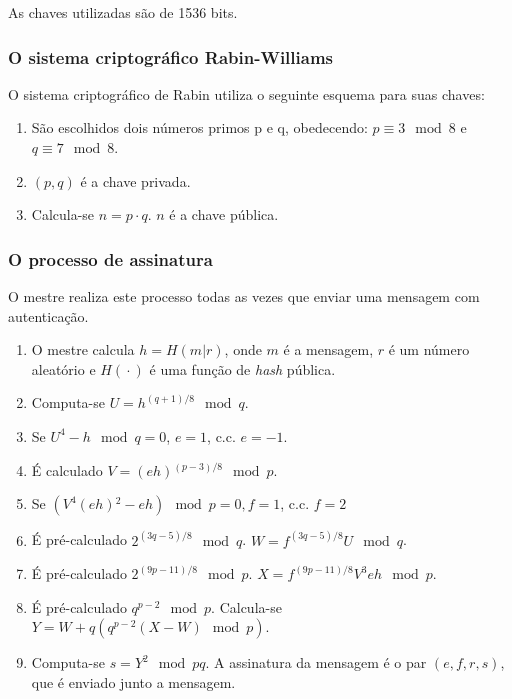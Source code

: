 As chaves utilizadas são de 1536 bits.

\subsubsection{O sistema criptográfico Rabin-Williams}

O sistema criptográfico de Rabin utiliza o seguinte esquema para suas chaves:

\begin{enumerate}

\item São escolhidos dois números primos p e q, obedecendo: $p \equiv 3 \mod{8}$ e $q \equiv 7 \mod{8}$.

\item $\left({}p,q\right)$ é a chave privada.

\item Calcula-se $n=p\cdot{}q$. $n$ é a chave pública.

\end{enumerate}

\subsubsection{O processo de assinatura}

O mestre realiza este processo todas as vezes que enviar uma mensagem com autenticação.

\begin{enumerate}

\item O mestre calcula $h = H\left({}m|r\right){}$, onde $m$ é a mensagem, $r$ é um número aleatório e $H\left({}\cdot{}\right){}$ é uma função de \textit{hash} pública.

\item Computa-se $U = h^{(q+1)/8} \mod{q}$.
\item Se $U^4 - h \mod{q} = 0$, $e = 1$, c.c. $e = -1$.
\item É calculado $V = \left({}eh\right){}^{(p-3)/8} \mod{p}$.
\item Se $\left({}V^4\left({}eh\right){}^2 - eh\right){} \mod{p} = 0, f = 1$, c.c. $f = 2$
\item É pré-calculado $2^{(3q-5)/8} \mod{q}$. $W = f^{(3q-5)/8}U \mod{q}$.
\item É pré-calculado $2^{(9p-11)/8} \mod{p}.$ $X = f^{(9p-11)/8}V^3eh \mod{p}$.
\item É pré-calculado $q^{p-2} \mod{p}$. Calcula-se $Y = W + q\left({}q^{p-2}\left({}X - W\right){} \mod{p}\right)$.
\item Computa-se $s = Y^2 \mod{pq}$. A assinatura da mensagem é o par $\left({}e,f,r,s\right)$, que é enviado junto a mensagem.

\end{enumerate}

